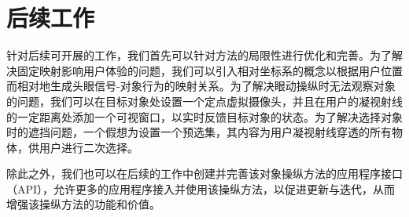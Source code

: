 \section{后续工作}

针对后续可开展的工作，我们首先可以针对方法的局限性进行优化和完善。为了解决固定映射影响用户体验的问题，我们可以引入相对坐标系的概念以根据用户位置而相对地生成头眼信号-对象行为的映射关系。为了解决眼动操纵时无法观察对象的问题，我们可以在目标对象处设置一个定点虚拟摄像头，并且在用户的凝视射线的一定距离处添加一个可视窗口，以实时反馈目标对象的状态。为了解决选择对象时的遮挡问题，一个假想为设置一个预选集，其内容为用户凝视射线穿透的所有物体，供用户进行二次选择。

除此之外，我们也可以在后续的工作中创建并完善该对象操纵方法的应用程序接口（API），允许更多的应用程序接入并使用该操纵方法，以促进更新与迭代，从而增强该操纵方法的功能和价值。